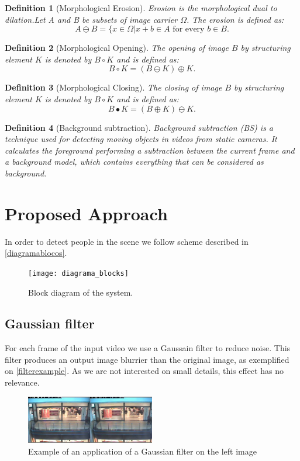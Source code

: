 \documentclass[10pt, conference]{IEEEtran}
\newtheorem{definition}{Definition}
\begin{document}
	\begin{definition}[Morphological Erosion]
		Erosion is the morphological dual to dilation.Let A and B be subsets of image carrier $\Omega$. The erosion is defined as: $$A \ominus B=\{x\in\Omega | x+b \in A \text{ for every }b\in B.$$
	\end{definition}
	
	\begin{definition}[Morphological Opening]
		The opening of image $B$ by structuring	element $K$ is denoted by $B \circ K$ and is defined as: $$B \circ K =(B \ominus K) \oplus K.$$
	\end{definition}
	
	\begin{definition}[Morphological Closing]
		The closing of image $B$ by structuring	element $K$ is denoted by $B \circ K$ and is defined as: $$B \bullet K =(B \oplus K) \ominus K.$$
	\end{definition}
	
	\begin{definition}[Background subtraction]
		Background subtraction (BS) is a technique used for detecting moving objects in videos from static cameras. It calculates the foreground performing a subtraction between the current frame and a background model, which contains everything that can be considered as background.
	\end{definition}
	
	\section{Proposed Approach}
	In order to detect people in the scene we follow scheme described in \autoref{diagramablocos}.
	\begin{figure}[H]
		\centering
		\texttt{[image: diagrama\_blocks]}
		\caption{Block diagram of the system.}
		\label{diagramablocos}
	\end{figure}
	
	
	\subsection{Gaussian filter}
	For each frame of the input video we use a Gaussain filter to reduce noise. This filter produces an output image blurrier than the original image, as exemplified on \autoref{filterexample}. As we are not interested on small details, this effect has no relevance.
	\begin{figure}[H]
		\includegraphics[width=0.5\textwidth]{filterexample}
		\centering
		\caption{Example of an application of a Gaussian filter on the left image}
		\label{filterexample}
	\end{figure}
\end{document}
